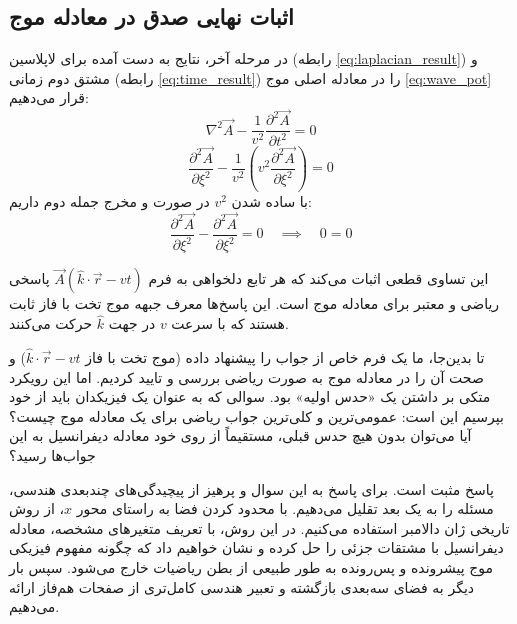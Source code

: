 \documentclass[12pt,a4paper]{article}
\begin{document}
\subsection{اثبات نهایی صدق در معادله موج}
در مرحله آخر، نتایج به دست آمده برای لاپلاسین (رابطه \eqref{eq:laplacian_result}) و مشتق دوم زمانی (رابطه \eqref{eq:time_result}) را در معادله اصلی موج \eqref{eq:wave_pot} قرار می‌دهیم:
\begin{equation}
    \nabla^2 \vec{A} - \frac{1}{v^2}\frac{\partial^2 \vec{A}}{\partial t^2} = 0
\end{equation}
\begin{equation}
    \frac{\partial^2 \vec{A}}{\partial \xi^2} - \frac{1}{v^2} \left( v^2 \frac{\partial^2 \vec{A}}{\partial \xi^2} \right) = 0
\end{equation}
با ساده شدن $v^2$ در صورت و مخرج جمله دوم داریم:
\begin{equation}
    \frac{\partial^2 \vec{A}}{\partial \xi^2} - \frac{\partial^2 \vec{A}}{\partial \xi^2} = 0 \quad \implies \quad 0 = 0
\end{equation}

این تساوی قطعی اثبات می‌کند که هر تابع دلخواهی به فرم $\vec{A}(\hat{k}\cdot\vec{r} - vt)$ پاسخی ریاضی و معتبر برای معادله موج است. این پاسخ‌ها معرف جبهه موج تخت با فاز ثابت هستند که با سرعت $v$ در جهت $\hat{k}$ حرکت می‌کنند.

\vspace{0.5cm}
\begin{tcolorbox}[colback=gray!8, colframe=gray!75, title=\textbf{گذار مفهومی ۲: از راستی‌آزمایی جواب تا استخراج جواب عمومی دالامبر}]
تا بدین‌جا، ما یک فرم خاص از جواب را پیشنهاد داده (موج تخت با فاز $\hat{k}\cdot\vec{r} - vt$) و صحت آن را در معادله موج به صورت ریاضی بررسی و تایید کردیم. اما این رویکرد متکی بر داشتن یک «حدس اولیه» بود. سوالی که به عنوان یک فیزیکدان باید از خود بپرسیم این است: عمومی‌ترین و کلی‌ترین جواب ریاضی برای یک معادله موج چیست؟ آیا می‌توان بدون هیچ حدس قبلی، مستقیماً از روی خود معادله دیفرانسیل به این جواب‌ها رسید؟

پاسخ مثبت است. برای پاسخ به این سوال و پرهیز از پیچیدگی‌های چندبعدی هندسی، مسئله را به یک بعد تقلیل می‌دهیم. با محدود کردن فضا به راستای محور $x$، از روش تاریخی ژان دالامبر استفاده می‌کنیم. در این روش، با تعریف متغیرهای مشخصه، معادله دیفرانسیل با مشتقات جزئی را حل کرده و نشان خواهیم داد که چگونه مفهوم فیزیکی موج پیشرونده و پس‌رونده به طور طبیعی از بطن ریاضیات خارج می‌شود. سپس بار دیگر به فضای سه‌بعدی بازگشته و تعبیر هندسی کامل‌تری از صفحات هم‌فاز ارائه می‌دهیم.
\end{tcolorbox}
\vspace{0.5cm}
\end{document}
